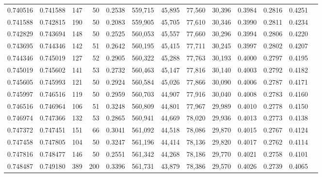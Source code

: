 \begin{tabular}{rrrrrrrrrrrrr}
0.740516 & 0.741588 &   147 &  50 &                                     0.2538 & 559,715 &  45,895 &  77,560 &  30,396 & 0.3984 & 0.2816 & 0.4251 \\
0.741588 & 0.742815 &   190 &  50 &                                     0.2083 & 559,905 &  45,705 &  77,610 &  30,346 & 0.3990 & 0.2811 & 0.4234 \\
0.742829 & 0.743694 &   148 &  50 &                                     0.2525 & 560,053 &  45,557 &  77,660 &  30,296 & 0.3994 & 0.2806 & 0.4220 \\
0.743695 & 0.744346 &   142 &  51 &                                     0.2642 & 560,195 &  45,415 &  77,711 &  30,245 & 0.3997 & 0.2802 & 0.4207 \\
0.744346 & 0.745019 &   127 &  52 &                                     0.2905 & 560,322 &  45,288 &  77,763 &  30,193 & 0.4000 & 0.2797 & 0.4195 \\
0.745019 & 0.745602 &   141 &  53 &                                     0.2732 & 560,463 &  45,147 &  77,816 &  30,140 & 0.4003 & 0.2792 & 0.4182 \\
0.745605 & 0.745993 &   121 &  50 &                                     0.2924 & 560,584 &  45,026 &  77,866 &  30,090 & 0.4006 & 0.2787 & 0.4171 \\
0.745997 & 0.746516 &   119 &  50 &                                     0.2959 & 560,703 &  44,907 &  77,916 &  30,040 & 0.4008 & 0.2783 & 0.4160 \\
0.746516 & 0.746964 &   106 &  51 &                                     0.3248 & 560,809 &  44,801 &  77,967 &  29,989 & 0.4010 & 0.2778 & 0.4150 \\
0.746974 & 0.747366 &   132 &  53 &                                     0.2865 & 560,941 &  44,669 &  78,020 &  29,936 & 0.4013 & 0.2773 & 0.4138 \\
0.747372 & 0.747451 &   151 &  66 &                                     0.3041 & 561,092 &  44,518 &  78,086 &  29,870 & 0.4015 & 0.2767 & 0.4124 \\
0.747458 & 0.747805 &   104 &  50 &                                     0.3247 & 561,196 &  44,414 &  78,136 &  29,820 & 0.4017 & 0.2762 & 0.4114 \\
0.747816 & 0.748477 &   146 &  50 &                                     0.2551 & 561,342 &  44,268 &  78,186 &  29,770 & 0.4021 & 0.2758 & 0.4101 \\
0.748487 & 0.749180 &   389 & 200 &                                     0.3396 & 561,731 &  43,879 &  78,386 &  29,570 & 0.4026 & 0.2739 & 0.4065 \\

\end{tabular}

